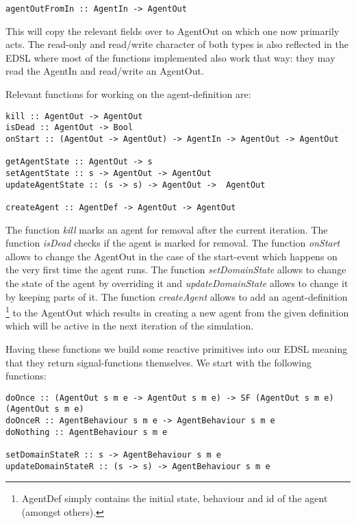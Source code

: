 \begin{verbatim}
agentOutFromIn :: AgentIn -> AgentOut
\end{verbatim}

This will copy the relevant fields over to AgentOut on which one now primarily acts. The read-only and read/write character of both types is also reflected in the EDSL where most of the functions implemented also work that way: they may read the AgentIn and read/write an AgentOut.

Relevant functions for working on the agent-definition are:

\begin{verbatim}
kill :: AgentOut -> AgentOut
isDead :: AgentOut -> Bool
onStart :: (AgentOut -> AgentOut) -> AgentIn -> AgentOut -> AgentOut

getAgentState :: AgentOut -> s
setAgentState :: s -> AgentOut -> AgentOut
updateAgentState :: (s -> s) -> AgentOut ->  AgentOut

createAgent :: AgentDef -> AgentOut -> AgentOut
\end{verbatim}

The function \textit{kill} marks an agent for removal after the current iteration. The function \textit{isDead} checks if the agent is marked for removal. The function \textit{onStart} allows to change the AgentOut in the case of the start-event which happens on the very first time the agent runs.
The function \textit{setDomainState} allows to change the state of the agent by overriding it and \textit{updateDomainState} allows to change it by keeping parts of it.
The function \textit{createAgent} allows to add an agent-definition \footnote{AgentDef simply contains the initial state, behaviour and id of the agent (amongst others).} to the AgentOut which results in creating a new agent from the given definition which will be active in the next iteration of the simulation. 

Having these functions we build some reactive primitives into our EDSL meaning that they return signal-functions themselves. We start with the following functions:

\begin{verbatim}
doOnce :: (AgentOut s m e -> AgentOut s m e) -> SF (AgentOut s m e) (AgentOut s m e)
doOnceR :: AgentBehaviour s m e -> AgentBehaviour s m e
doNothing :: AgentBehaviour s m e

setDomainStateR :: s -> AgentBehaviour s m e
updateDomainStateR :: (s -> s) -> AgentBehaviour s m e
\end{verbatim}

